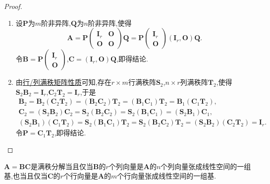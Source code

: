 \documentclass[../../main.tex]{subfiles}%
\begin{document}
\begin{proof}
\begin{enumerate}[(1)]
\item 设\(\boldsymbol{P}\)为\(m\)阶非异阵,\(\boldsymbol{Q}\)为\(n\)阶非异阵,使得
\[
\boldsymbol{A}=\boldsymbol{P}\begin{pmatrix}
\boldsymbol{I}_r&\boldsymbol{O}\\
\boldsymbol{O}&\boldsymbol{O}
\end{pmatrix}\boldsymbol{Q}=\boldsymbol{P}\begin{pmatrix}
\boldsymbol{I}_r\\
\boldsymbol{O}
\end{pmatrix}(\boldsymbol{I}_r,\boldsymbol{O})\boldsymbol{Q}.
\]
令\(\boldsymbol{B}=\boldsymbol{P}\begin{pmatrix}
\boldsymbol{I}_r\\
\boldsymbol{O}
\end{pmatrix}\),\(\boldsymbol{C}=(\boldsymbol{I}_r,\boldsymbol{O})\boldsymbol{Q}\),即得结论.

\item  由\hyperref[proposition:行/列满秩矩阵性质]{行/列满秩矩阵性质}可知,存在\(r\times m\)行满秩阵\(\boldsymbol{S}_2\),\(n\times r\)列满秩阵\(\boldsymbol{T}_2\),使得\(\boldsymbol{S}_2\boldsymbol{B}_2=\boldsymbol{I}_r\),\(\boldsymbol{C}_2\boldsymbol{T}_2=\boldsymbol{I}_r\),于是
\begin{gather*}
\boldsymbol{B}_2=\boldsymbol{B}_2(\boldsymbol{C}_2\boldsymbol{T}_2)=(\boldsymbol{B}_2\boldsymbol{C}_2)\boldsymbol{T}_2=(\boldsymbol{B}_1\boldsymbol{C}_1)\boldsymbol{T}_2=\boldsymbol{B}_1(\boldsymbol{C}_1\boldsymbol{T}_2),\\
\boldsymbol{C}_2=(\boldsymbol{S}_2\boldsymbol{B}_2)\boldsymbol{C}_2=\boldsymbol{S}_2(\boldsymbol{B}_2\boldsymbol{C}_2)=\boldsymbol{S}_2(\boldsymbol{B}_1\boldsymbol{C}_1)=(\boldsymbol{S}_2\boldsymbol{B}_1)\boldsymbol{C}_1,\\
(\boldsymbol{S}_2\boldsymbol{B}_1)(\boldsymbol{C}_1\boldsymbol{T}_2)=\boldsymbol{S}_2(\boldsymbol{B}_1\boldsymbol{C}_1)\boldsymbol{T}_2=\boldsymbol{S}_2(\boldsymbol{B}_2\boldsymbol{C}_2)\boldsymbol{T}_2=(\boldsymbol{S}_2\boldsymbol{B}_2)(\boldsymbol{C}_2\boldsymbol{T}_2)=\boldsymbol{I}_r.
\end{gather*}
令\(\boldsymbol{P}=\boldsymbol{C}_1\boldsymbol{T}_2\),即得结论.
\end{enumerate}

\end{proof}

\begin{proposition}\label{proposition:几何观点下的矩阵满秩分解}
\(\boldsymbol{A}=\boldsymbol{B}\boldsymbol{C}\)是满秩分解当且仅当\(\boldsymbol{B}\)的\(r\)个列向量是\(\boldsymbol{A}\)的\(n\)个列向量张成线性空间的一组基,也当且仅当\(\boldsymbol{C}\)的\(r\)个行向量是\(\boldsymbol{A}\)的\(m\)个行向量张成线性空间的一组基.
\end{proposition}
\end{document}
